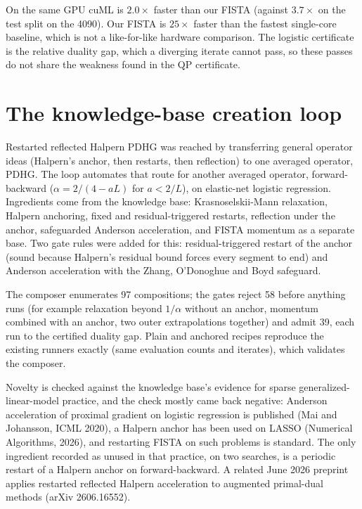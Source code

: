 \documentclass[11pt]{article}
\begin{document}
On the same GPU cuML is $2.0\times$ faster than our FISTA (against $3.7\times$ on
the test split on the 4090). Our FISTA is $25\times$ faster than the fastest
single-core baseline, which is not a like-for-like hardware comparison. The
logistic certificate is the relative duality gap, which a diverging iterate
cannot pass, so these passes do not share the weakness found in the QP
certificate.

\section{The knowledge-base creation loop}
\label{app:log:kbloop}

 Restarted reflected Halpern PDHG was reached
by transferring general operator ideas (Halpern's anchor, then restarts, then
reflection) to one averaged operator, PDHG. The loop automates that route for
another averaged operator, forward-backward ($\alpha = 2/(4-aL)$ for $a<2/L$),
on elastic-net logistic regression. Ingredients come from the knowledge base:
Krasnoselskii-Mann relaxation, Halpern anchoring, fixed and residual-triggered
restarts, reflection under the anchor, safeguarded Anderson acceleration, and
FISTA momentum as a separate base. Two gate rules were added for this:
residual-triggered restart of the anchor (sound because Halpern's residual
bound forces every segment to end) and Anderson acceleration with the
Zhang, O'Donoghue and Boyd safeguard.

The composer enumerates 97 compositions; the gates reject 58 before anything
runs (for example relaxation beyond $1/\alpha$ without an anchor, momentum
combined with an anchor, two outer extrapolations together) and admit 39,
each run to the certified duality gap. Plain and anchored recipes reproduce
the existing runners exactly (same evaluation counts and iterates), which
validates the composer.

Novelty is checked against the knowledge base's evidence for sparse
generalized-linear-model practice, and the check mostly came back negative:
Anderson acceleration of proximal gradient on logistic regression is
published (Mai and Johansson, ICML 2020), a Halpern anchor has been used on
LASSO (Numerical Algorithms, 2026), and restarting FISTA on such problems is
standard. The only ingredient recorded as unused in that practice, on two
searches, is a periodic restart of a Halpern anchor on forward-backward. A
related June 2026 preprint applies restarted reflected Halpern acceleration
to augmented primal-dual methods (arXiv 2606.16552).
\end{document}
